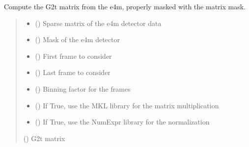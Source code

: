 \documentclass[letterpaper,10pt,english]{sphinxmanual}
\begin{document}

\begin{fulllineitems}
\label{\detokenize{index:XPCS_tools.get_G2t}}
\pysigstartsignatures
\pysiglinewithargsret
{}
{\sphinxparamcomma {}\sphinxparamcomma {}\sphinxparamcomma {}\sphinxparamcomma {}\sphinxparamcomma {}\sphinxparamcomma {}}
{}
\pysigstopsignatures
\sphinxAtStartPar
Compute the G2t matrix from the e4m, properly masked with the matrix mask.
\begin{quote}\begin{description}
\begin{itemize}
\item {} 
\sphinxAtStartPar
{} () \textendash{} Sparse matrix of the e4m detector data

\item {} 
\sphinxAtStartPar
{} () \textendash{} Mask of the e4m detector

\item {} 
\sphinxAtStartPar
{} () \textendash{} First frame to consider

\item {} 
\sphinxAtStartPar
{} () \textendash{} Last frame to consider

\item {} 
\sphinxAtStartPar
{} () \textendash{} Binning factor for the frames

\item {} 
\sphinxAtStartPar
{} () \textendash{} If True, use the MKL library for the matrix multiplication

\item {} 
\sphinxAtStartPar
{} () \textendash{} If True, use the NumExpr library for the normalization

\end{itemize}

\sphinxAtStartPar
{} () \textendash{} G2t matrix

\end{description}\end{quote}

\end{fulllineitems}
\end{document}
